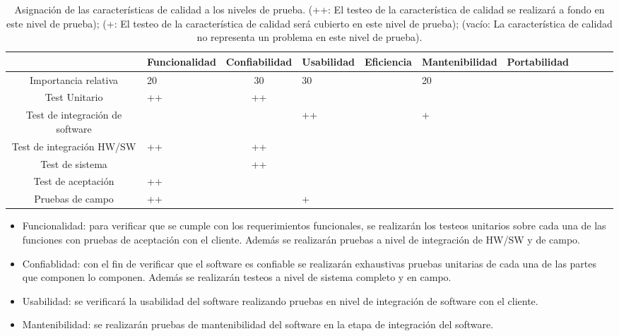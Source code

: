 \documentclass[12pt]{article}
\begin{document}
\begin{table}[ht]
    \centering

       \begin{tabularx}{\linewidth}{@{}|c|X|c|X|c|X|c|X|c|X|c|@{}}\hline \hline
            \rowcolor[HTML]{d6c6c3}     
                   & \bf Funcionalidad  & \bf Confiabilidad & \bf Usabilidad & \bf
            Eficiencia                      & \bf Mantenibilidad & \bf Portabilidad                              \\ \hline
            \hline
            Importancia relativa            &          20        &            30     &       30       &     & 20 &
            \\
            Test Unitario                   &           ++       &           ++      &                &     &  & \\
            Test de integración de software &                    &                   &        ++        &     & + &
            \\
            Test de integración HW/SW       &           ++       &          ++       &                &     &  &
            \\
            Test de sistema                 &                    &           ++        &                &     &  & \\
            Test de aceptación              &           ++       &                   &                &     & 
             &
            \\
            Pruebas de campo                &          ++        &                 &        +        &     &  &
            \\ \hline
        \end{tabularx}
        \caption{Asignación de las características de calidad a los niveles de prueba. (++: El testeo de la característica de calidad
se realizará a fondo en este nivel de prueba); (+: El testeo de la característica de calidad será cubierto en este nivel de
prueba); (vacío: La característica de calidad no representa un problema en este nivel de prueba).}
  
    
\end{table}
\begin{itemize}
\item Funcionalidad: para verificar que se cumple con los requerimientos funcionales, se realizarán los testeos unitarios sobre cada una de las funciones con pruebas de aceptación con el cliente. Además se realizarán pruebas a nivel de integración de HW/SW y de campo.
\item Confiablidad: con el fin de verificar que el software es confiable se realizarán exhaustivas pruebas unitarias de cada una de las partes que componen lo componen. Además se realizarán testeos a nivel de sistema completo y en campo.
\item Usabilidad: se verificará la usabilidad del software realizando pruebas en nivel de integración de software con el cliente.
\item Mantenibilidad: se realizarán pruebas de mantenibilidad del software en la etapa de integración del software.
\end{itemize}
\end{document}
